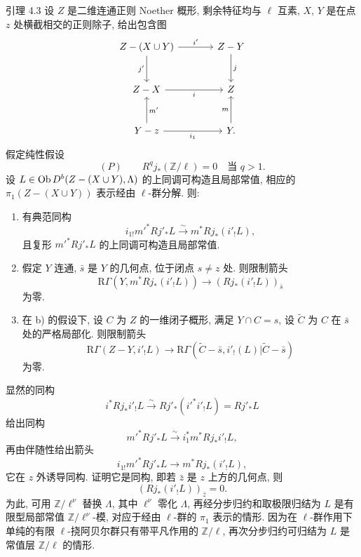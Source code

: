 \begin{statement}{引理 4.3}
设 $Z$ 是二维连通正则 Noether 概形, 剩余特征均与 $\ell$ 互素, $X$, $Y$ 是在点 $z$ 处横截相交的正则除子, 给出包含图
\[
\begin{tikzcd}[column sep=large,row sep=large]
Z-(X\cup Y) \arrow[r,"i'"] \arrow[d,"j'"'] & Z-Y \arrow[d,"j"]\\
Z-X \arrow[r,"i"'] & Z\\
Y-z \arrow[r,"i_1"'] \arrow[u,"m'"'] & Y \arrow[u,"m"] .
\end{tikzcd}
\]
假定纯性假设
\[
(P)\qquad R^qj_*(\mathbb Z/\ell)=0\quad\text{当 }q>1.
\]
设 $L\in\operatorname{Ob} D^b(Z-(X\cup Y),\Lambda)$ 的上同调可构造且局部常值, 相应的 $\pi_1(Z-(X\cup Y))$ 表示经由 $\ell$-群分解. 则:
\begin{enumerate}[label=\alph*)]
\item 有典范同构
\[
i_{1!}m'^*Rj'_*L\xrightarrow{\sim} m^*Rj_*(i'_!L),
\]
且复形 $m'^*Rj'_*L$ 的上同调可构造且局部常值.
\item 假定 $Y$ 连通, $\bar s$ 是 $Y$ 的几何点, 位于闭点 $s\ne z$ 处. 则限制箭头
\begin{equation}
\mathrm R\Gamma(Y,m^*Rj_*(i'_!L))\longrightarrow (Rj_*(i'_!L))_{\bar s}
\tag{4.3.1}
\end{equation}
为零.
\item 在 b) 的假设下, 设 $C$ 为 $Z$ 的一维闭子概形, 满足 $Y\cap C=s$, 设 $\widetilde C$ 为 $C$ 在 $\bar s$ 处的严格局部化. 则限制箭头
\begin{equation}
\mathrm R\Gamma(Z-Y,i'_!L)
\longrightarrow
\mathrm R\Gamma(\widetilde C-\bar s,i'_!(L)|\widetilde C-\bar s)
\tag{4.3.2}
\end{equation}
为零.
\end{enumerate}
\end{statement}

显然的同构
\[
i^*Rj_*i'_!L\xrightarrow{\sim}Rj'_*(i'^*i'_!L)=Rj'_*L
\]
给出同构
\[
m'^*Rj'_*L\xrightarrow{\sim} i_1^*m^*Rj_*i'_!L,
\]
再由伴随性给出箭头
\[
i_{1!}m'^*Rj'_*L\longrightarrow m^*Rj_*(i'_!L),
\]
它在 $z$ 外诱导同构. 证明它是同构, 即若 $\bar z$ 是 $z$ 上方的几何点, 则
\[
(Rj_*(i'_!L))_{\bar z}=0.
\]
为此, 可用 $\mathbb Z/\ell^\nu$ 替换 $\Lambda$, 其中 $\ell^\nu$ 零化 $\Lambda$, 再经分步归约和取极限归结为 $L$ 是有限型局部常值 $\mathbb Z/\ell^\nu$-模, 对应于经由 $\ell$-群的 $\pi_1$ 表示的情形. 因为在 $\ell$-群作用下单纯的有限 $\ell$-挠阿贝尔群只有带平凡作用的 $\mathbb Z/\ell$, 再次分步归约可归结为 $L$ 是常值层 $\mathbb Z/\ell$ 的情形.

